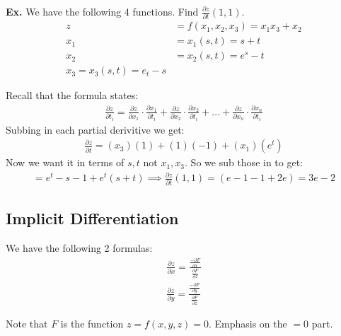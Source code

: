 \documentclass[12pt,letterpaper]{article} \usepackage{amsmath} \usepackage{graphicx}  \usepackage{longtable}  \usepackage{amssymb}
\begin{document}
        \begin{mdframed}
            \textbf{Ex. } We have the following 4 functions. Find $\frac{\partial z}{\partial t}(1,1)$.
            \begin{align}
                z&=f(x_1, x_2, x_3) = x_1 x_3 + x_2\\
                x_1 &=x_1(s,t) = s+t\\
                x_2 &=x_2 (s,t) = e^s-t\\
                x_3 = x_3(s,t) = e_t-s
            \end{align}

            Recall that the formula states:
            \begin{align*}
                \frac{\partial z}{\partial t_i} = \frac{\partial z}{\partial x_1}\cdot \frac{\partial x_1}{\partial t_i} + \frac{\partial z}{\partial x_2}\cdot \frac{\partial x_2}{\partial t_i} + ... + \frac{\partial z}{\partial x_n}\cdot \frac{\partial x_n}{\partial t_i}
            \end{align*}
            Subbing in each partial derivitive we get:
            \begin{align*}
                \frac{\partial z}{\partial t} = (x_3)(1) + (1)(-1) + (x_1)(e^t) 
            \end{align*}
            Now we want it in terms of $s, t$ not $x_1, x_3$. So we sub those in to get:
            \begin{align*}
                = e^t - s - 1 + e^t (s+t) \implies \frac{\partial z}{\partial t} (1,1) = (e-1-1+2e) = 3e-2
            \end{align*}
        \end{mdframed}

        \subsection{Implicit Differentiation}
        We have the following 2 formulas:
        \begin{align*}
            \frac{\partial z}{\partial x} = \frac{\frac{-\partial F}{\partial x}}{\frac{\partial F}{\partial z}} \\
            \frac{\partial z}{\partial y} = \frac{\frac{-\partial F}{\partial y}}{\frac{\partial F}{\partial z}}
        \end{align*}

        Note that $F$ is the function $z=f(x,y,z) = 0$. Emphasis on the $=0$ part. 
\end{document}
